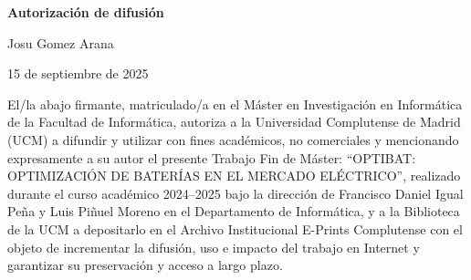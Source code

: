 \newpage

\thispagestyle{empty}

\begin{center}

  {\bf \Huge Autorización de difusión}

  \vspace{1cm}

  \large Josu Gomez Arana

  \vspace{0.5cm}

  15 de septiembre de 2025

  \vspace{0.5cm}

\end{center}

El/la abajo firmante, matriculado/a en el Máster en Investigación en Informática de la Facultad de Informática, autoriza a la Universidad Complutense de Madrid (UCM) a difundir y utilizar con fines académicos, no comerciales y mencionando expresamente a su autor el presente Trabajo Fin de Máster: “OPTIBAT: OPTIMIZACIÓN DE BATERÍAS EN EL MERCADO ELÉCTRICO”, realizado durante el curso académico 2024--2025 bajo la dirección de Francisco Daniel Igual Peña y Luis Piñuel Moreno en el Departamento de Informática, y a la Biblioteca de la UCM a depositarlo en el Archivo Institucional E-Prints Complutense con el objeto de incrementar la difusión, uso e impacto del trabajo en Internet y garantizar su preservación y acceso a largo plazo.
